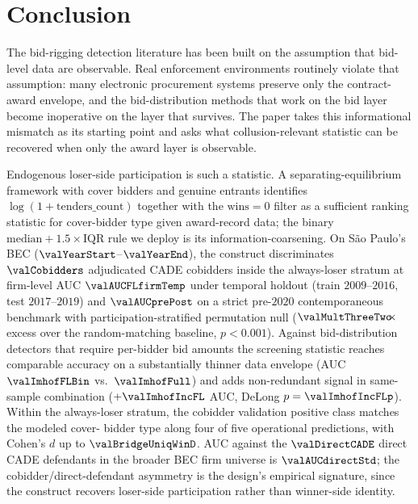 \section{Conclusion}
\label{sec:conclusion}

The bid-rigging detection literature has been built on the
assumption that bid-level data are observable. Real enforcement
environments routinely violate that assumption: many electronic
procurement systems preserve only the contract-award envelope,
and the bid-distribution methods that work on the bid layer
become inoperative on the layer that survives. The paper takes
this informational mismatch as its starting point and asks what
collusion-relevant statistic can be recovered when only the
award layer is observable.

Endogenous loser-side participation is such a statistic. A
separating-equilibrium framework with cover bidders and genuine
entrants identifies $\log(1+\text{tenders\_count})$ together
with the $\text{wins}=0$ filter as a sufficient ranking
statistic for cover-bidder type given award-record data; the
binary $\text{median}+1.5\!\times\!\text{IQR}$ rule we deploy
is its information-coarsening. On São Paulo's BEC
($\valYearStart$--$\valYearEnd$), the construct discriminates
$\valCobidders$ adjudicated CADE cobidders inside the always-loser
stratum at firm-level AUC $\valAUCFLfirmTemp$ under temporal
holdout (train $2009$--$2016$, test $2017$--$2019$) and
$\valAUCprePost$ on a strict pre-$2020$ contemporaneous benchmark
with participation-stratified permutation null
($\valMultThreeTwo\!\!\times$ excess over the random-matching
baseline, $p<0.001$). Against bid-distribution detectors that
require per-bidder bid amounts the screening statistic reaches
comparable accuracy on a substantially thinner data envelope (AUC
$\valImhofFLBin$ vs.\ $\valImhofFull$) and adds non-redundant
signal in same-sample combination ($+\valImhofIncFL$ AUC, DeLong
$p=\valImhofIncFLp$). Within the always-loser stratum, the
cobidder validation positive class matches the modeled cover-
bidder type along four of five operational predictions, with
Cohen's $d$ up to $\valBridgeUniqWinD$. AUC against the $\valDirectCADE$
direct CADE defendants in the broader BEC firm universe is
$\valAUCdirectStd$; the cobidder/direct-defendant asymmetry is
the design's empirical signature, since the construct recovers
loser-side participation rather than winner-side identity.

